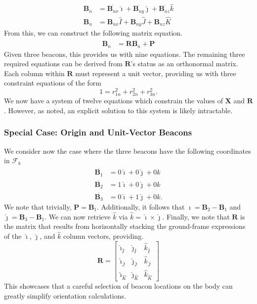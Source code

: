 \documentclass{report}
\begin{document}
					\begin{align}
						\mathbf{B}_n&=\overline{\mathbf{B}_{nx}}\hat{\imath} +  \overline{\mathbf{B}_{ny}}\hat{\jmath} + \overline{\mathbf{B}_{nz}}\hat{k} \\
						\mathbf{B}_n&=\mathbf{B}_{nx}\hat{I} +  \mathbf{B}_{ny}\hat{J} + \mathbf{B}_{nz}\hat{K}
					\end{align}
					From this, we can construct the following matrix equation.
					\begin{align}
						\mathbf{B}_{n}&=\mathbf{R}\overline{\mathbf{B}_n}+\mathbf{P}
					\end{align}
					Given three beacons, this provides us with nine equations. The remaining three required equations can be derived from $\mathbf{R}$'s status as an orthonormal matrix. Each column within $\mathbf{R}$ must represent a unit vector, providing us with three constraint equations of the form
					\begin{equation}
						1=r_{1n}^2 + r_{2n}^2 + r_{3n}^2.
					\end{equation}
					We now have a system of twelve equations which constrain the values of $\mathbf{X}$ and $\mathbf{R}$. However, as noted, an explicit solution to this system is likely intractable.
				
\newpage
				
				\subsubsection{Special Case: Origin and Unit-Vector Beacons}
					We consider now the case where the three beacons have the following coordinates in $\mathcal{F}_b$
					\begin{align*}
						\overline{\mathbf{B}_1}&=0\hat{\imath} + 0\hat{\jmath} + 0\hat{k} \\
						\overline{\mathbf{B}_2}&=1\hat{\imath} + 0\hat{\jmath} + 0\hat{k} \\
						\overline{\mathbf{B}_3}&=0\hat{\imath} + 1\hat{\jmath} + 0\hat{k}.
					\end{align*}
					We note that trivially, $\mathbf{P}=\mathbf{B}_1$. Additionally, it follows that $\hat{\imath}=\mathbf{B}_2-\mathbf{B}_1$ and $\hat{\jmath}=\mathbf{B}_3-\mathbf{B}_1$. We can now retrieve $\hat{k}$ via $\hat{k}=\hat{\imath}\times\hat{\jmath}$. Finally, we note that $\mathbf{R}$ is the matrix that results from horizontally stacking the ground-frame expressions of the $\hat{\imath}$, $\hat{\jmath}$, and $\hat{k}$ column vectors, providing.
					\begin{equation}
						\mathbf{R}=\begin{bmatrix}
							\hat{\imath}_{\hat{I}} & \hat{\jmath}_{\hat{I}} & \hat{k}_{\hat{I}} \\
							\hat{\imath}_{\hat{J}} & \hat{\jmath}_{\hat{J}} & \hat{k}_{\hat{J}} \\
							\hat{\imath}_{\hat{K}} & \hat{\jmath}_{\hat{K}} & \hat{k}_{\hat{K}}
						\end{bmatrix}
					\end{equation}
					This showcases that a careful selection of beacon locations on the body can greatly simplify orientation calculations.
\end{document}
